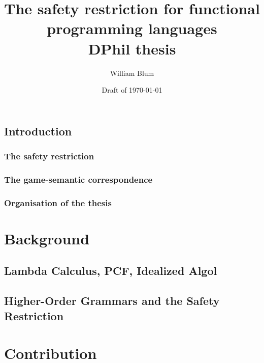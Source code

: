 


\author{William Blum}
\title{The safety restriction for functional programming languages\\{\small DPhil thesis}}
\date{Draft of \today}


\maketitle \tableofcontents


\chapter{Introduction}
    \section{The safety restriction}
    \section{The game-semantic correspondence}
    \section{Organisation of the thesis}

\part{Background}
    \chapter{Lambda Calculus, PCF, Idealized Algol}
    
    \chapter{Higher-Order Grammars and the Safety Restriction}

\part{Contribution}

